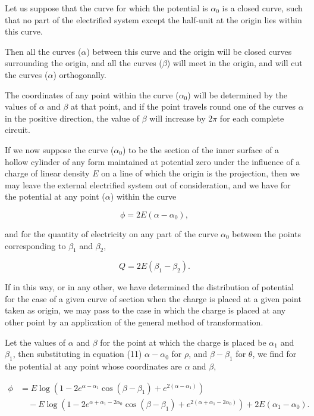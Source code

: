 \documentclass[11pt,a4paper]{article}
\begin{document}
Let us suppose that the curve for which the potential is $\alpha_0$ is a closed curve, such that no part of the electrified system except the half-unit at the origin lies within this curve.

Then all the curves ($\alpha$) between this curve and the origin will be closed curves surrounding the origin, and all the curves ($\beta$) will meet in the origin, and will cut the curves ($\alpha$) orthogonally.

The coordinates of any point within the curve ($\alpha_0$) will be determined by the values of $\alpha$ and $\beta$ at that point, and if the point travels round one of the curves $\alpha$ in the positive direction, the value of $\beta$ will increase by $2\pi$ for each complete circuit.

If we now suppose the curve ($\alpha_0$) to be the section of the inner surface of a hollow cylinder of any form maintained at potential zero under the influence of a charge of linear density $E$ on a line of which the origin is the projection, then we may leave the external electrified system out of consideration, and we have for the potential at any point ($\alpha$) within the curve

\begin{equation}\tag{12}
\phi = 2E(\alpha - \alpha_0),
\end{equation}

and for the quantity of electricity on any part of the curve $\alpha_0$ between the points corresponding to $\beta_1$ and $\beta_2$,

\begin{equation}\tag{13}
Q = 2E(\beta_1-\beta_2).
\end{equation}

If in this way, or in any other, we have determined the distribution of potential for the case of a given curve of section when the charge is placed at a given point taken as origin, we may pass to the case in which the charge is placed at any other point by an application of the general method of transformation.

Let the values of $\alpha$ and $\beta$ for the point at which the charge is placed be $\alpha_1$ and $\beta_1$, then substituting in equation (11) $\alpha-\alpha_0$ for $\rho$, and $\beta-\beta_1$ for $\theta$, we find for the potential at any point whose coordinates are $\alpha$ and $\beta$,

\begin{equation}\tag{14}
\begin{split}
\phi
&= E\log\left(1-2e^{\alpha-\alpha_1}\cos(\beta-\beta_1)+e^{2(\alpha-\alpha_1)}\right)\\
&\quad
-E\log\left(1-2e^{\alpha+\alpha_1-2\alpha_0}\cos(\beta-\beta_1)
+e^{2(\alpha+\alpha_1-2\alpha_0)}\right)
+2E(\alpha_1-\alpha_0).
\end{split}
\end{equation}
\end{document}
